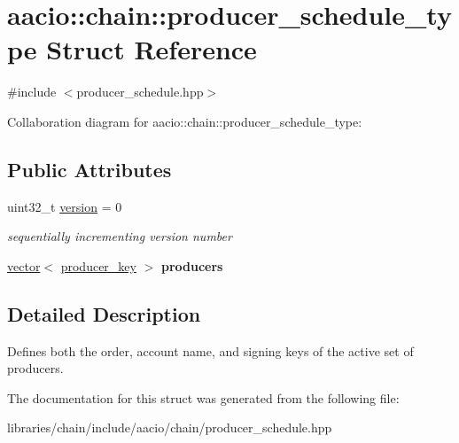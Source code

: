 \hypertarget{structaacio_1_1chain_1_1producer__schedule__type}{}\section{aacio\+:\+:chain\+:\+:producer\+\_\+schedule\+\_\+type Struct Reference}
\label{structaacio_1_1chain_1_1producer__schedule__type}


{\ttfamily \#include $<$producer\+\_\+schedule.\+hpp$>$}



Collaboration diagram for aacio\+:\+:chain\+:\+:producer\+\_\+schedule\+\_\+type\+:
\subsection*{Public Attributes}
\begin{DoxyCompactItemize}
\item 
\mbox{\label{structaacio_1_1chain_1_1producer__schedule__type_a11c59f81bc036000082668a2edc37745}} 
uint32\+\_\+t \mbox{\hyperlink{structaacio_1_1chain_1_1producer__schedule__type_a11c59f81bc036000082668a2edc37745}{version}} = 0
\begin{DoxyCompactList}\small\item\em sequentially incrementing version number \end{DoxyCompactList}\item 
\mbox{\label{structaacio_1_1chain_1_1producer__schedule__type_a37fd26a80ba96607d21e7276a3c4cf7c}} 
\mbox{\hyperlink{classstd_1_1vector}{vector}}$<$ \mbox{\hyperlink{structaacio_1_1chain_1_1producer__key}{producer\+\_\+key}} $>$ {\bfseries producers}
\end{DoxyCompactItemize}


\subsection{Detailed Description}
Defines both the order, account name, and signing keys of the active set of producers. 

The documentation for this struct was generated from the following file\+:\begin{DoxyCompactItemize}
\item 
libraries/chain/include/aacio/chain/producer\+\_\+schedule.\+hpp\end{DoxyCompactItemize}

